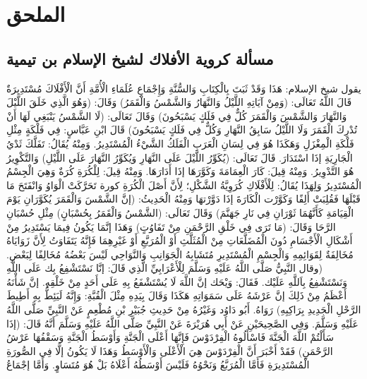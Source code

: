 \chapter{الملحق}
\label{sec:appendix}

\section{مسألة كروية الأفلاك لشيخ الإسلام بن تيمية}
\label{sec:app_round_planets_teimia}

يقول شيخ الإسلام: هَذَا وَقَدْ ثَبَتَ بِالْكِتَابِ وَالسُّنَّةِ وَإِجْمَاعِ عُلَمَاءِ الْأُمَّةِ أَنَّ الْأَفْلَاكَ مُسْتَدِيرَةٌ قَالَ اللَّهُ تَعَالَى: (وَمِنْ آيَاتِهِ اللَّيْلُ وَالنَّهَارُ وَالشَّمْسُ وَالْقَمَرُ) وَقَالَ: (وَهُوَ الَّذِي خَلَقَ اللَّيْلَ وَالنَّهَارَ وَالشَّمْسَ وَالْقَمَرَ كُلٌّ فِي فَلَكٍ يَسْبَحُونَ) وَقَالَ تَعَالَى: (لَا الشَّمْسُ يَنْبَغِي لَهَا أَنْ تُدْرِكَ الْقَمَرَ وَلَا اللَّيْلُ سَابِقُ النَّهَارِ وَكُلٌّ فِي فَلَكٍ يَسْبَحُونَ) قَالَ ابْنِ عَبَّاسٍ: فِي فَلْكَةٍ مِثْلِ فَلْكَةِ الْمِغْزَلِ وَهَكَذَا هُوَ فِي لِسَانِ الْعَرَبِ الْفَلَكُ الشَّيْءُ الْمُسْتَدِيرُ. وَمِنْهُ يُقَالُ: تَفَلَّكَ ثَدْيُ الْجَارِيَةِ إذَا اسْتَدَارَ. قَالَ تَعَالَى: (يُكَوِّرُ اللَّيْلَ عَلَى النَّهَارِ وَيُكَوِّرُ النَّهَارَ عَلَى اللَّيْلِ) وَالتَّكْوِيرُ هُوَ التَّدْوِيرُ. وَمِنْهُ قِيلَ: كَارَ الْعِمَامَةَ وَكَوَّرَهَا إذَا أَدَارَهَا. وَمِنْهُ قِيلَ: لِلْكُرَةِ كُرَةٌ وَهِيَ الْجِسْمُ الْمُسْتَدِيرُ وَلِهَذَا يُقَالُ: لِلْأَفْلَاكِ كُرَوِيَّةُ الشَّكْلِ؛ لِأَنَّ أَصْلَ الْكُرَةِ كورة تَحَرَّكَتْ الْوَاوُ وَانْفَتَحَ مَا قَبْلَهَا فَقُلِبَتْ أَلِفًا وَكَوَّرْت الْكَارَةَ إذَا دَوَّرْتهَا وَمِنْهُ الْحَدِيثُ: (إنَّ الشَّمْسَ وَالْقَمَرَ يُكَوَّرَانِ يَوْمَ الْقِيَامَةِ كَأَنَّهُمَا ثَوْرَانِ فِي نَارِ جَهَنَّمَ) وَقَالَ تَعَالَى: (الشَّمْسُ وَالْقَمَرُ بِحُسْبَانٍ) مِثْلِ حُسْبَانِ الرَّحَا وَقَالَ: (مَا تَرَى فِي خَلْقِ الرَّحْمَنِ مِنْ تَفَاوُتٍ) وَهَذَا إنَّمَا يَكُونُ فِيمَا يَسْتَدِيرُ مِنْ أَشْكَالِ الْأَجْسَامِ دُونَ الْمُضَلَّعَاتِ مِنْ الْمُثَلَّثِ أَوْ الْمُرَبَّعِ أَوْ غَيْرِهِمَا فَإِنَّهُ يَتَفَاوَتُ لِأَنَّ زَوَايَاهُ مُخَالِفَةٌ لِقَوَائِمِهِ وَالْجِسْمِ الْمُسْتَدِيرِ مُتَشَابِهُ الْجَوَانِبِ وَالنَّوَاحِي لَيْسَ بَعْضُهُ مُخَالِفًا لِبَعْضِ. (وقال النَّبِيُّ صَلَّى اللَّهُ عَلَيْهِ وَسَلَّمَ لِلْأَعْرَابِيِّ الَّذِي قَالَ: إنَّا نَسْتَشْفِعُ بِك عَلَى اللَّهِ وَنَسْتَشْفِعُ بِاَللَّهِ عَلَيْك. فَقَالَ: وَيْحَك إنَّ اللَّهَ لَا يُسْتَشْفَعُ بِهِ عَلَى أَحَدٍ مِنْ خَلْقِهِ. إنَّ شَأْنَهُ أَعْظَمُ مِنْ ذَلِكَ إنَّ عَرْشَهُ عَلَى سَمَوَاتِهِ هَكَذَا وَقَالَ بِيَدِهِ مِثْلَ الْقُبَّةِ: وَإِنَّهُ لَيَئِطُّ بِهِ أَطِيطَ الرَّحْلِ الْجَدِيدِ بِرَاكِبِهِ) رَوَاهُ. أَبُو دَاوُد وَغَيْرُهُ مِنْ حَدِيثِ جُبَيْرِ بْنِ مُطْعِمٍ عَنْ النَّبِيِّ صَلَّى اللَّهُ عَلَيْهِ وَسَلَّمَ. وَفِي الصَّحِيحَيْنِ عَنْ أَبِي هُرَيْرَةَ عَنْ النَّبِيِّ صَلَّى اللَّهُ عَلَيْهِ وَسَلَّمَ أَنَّهُ قَالَ: (إذَا سَأَلْتُمْ اللَّهَ الْجَنَّةَ فَاسْأَلُوهُ الْفِرْدَوْسَ فَإِنَّهَا أَعْلَى الْجَنَّةِ وَأَوْسَطُ الْجَنَّةِ وَسَقْفُهَا عَرْشُ الرَّحْمَنِ) فَقَدْ أَخْبَرَ أَنَّ الْفِرْدَوْسَ هِيَ الْأَعْلَى وَالْأَوْسَطُ وَهَذَا لَا يَكُونُ إلَّا فِي الصُّورَةِ الْمُسْتَدِيرَةِ فَأَمَّا الْمُرَبَّعُ وَنَحْوُهُ فَلَيْسَ أَوْسَطُهُ أَعْلَاهُ بَلْ هُوَ مُتَسَاوٍ. وَأَمَّا إجْمَاعُ 